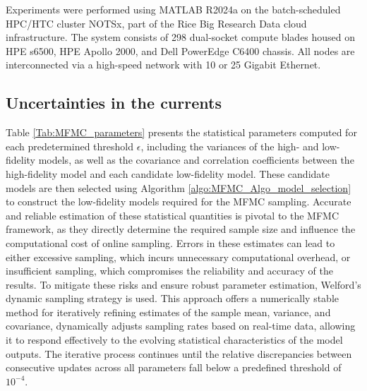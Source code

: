 Experiments were performed using MATLAB R2024a on the batch-scheduled HPC/HTC cluster NOTSx, part of the Rice Big Research Data cloud infrastructure. The system consists of 298 dual-socket compute blades housed on HPE s6500, HPE Apollo 2000, and Dell PowerEdge C6400 chassis. All nodes are interconnected via a high-speed network with 10 or 25 Gigabit Ethernet.


\subsection{Uncertainties in the currents}
Table \ref{Tab:MFMC_parameters} presents the statistical parameters computed for each predetermined threshold $\epsilon$, including the variances of the high- and low-fidelity models, as well as the covariance and correlation coefficients between the high-fidelity model and each candidate low-fidelity model. These candidate models are then selected using Algorithm \ref{algo:MFMC_Algo_model_selection} to construct the low-fidelity models required for the MFMC sampling. Accurate and reliable estimation of these statistical quantities is pivotal to the MFMC framework, as they directly determine the required sample size and influence the computational cost of online sampling. Errors in these estimates can lead to either excessive sampling, which incurs unnecessary computational overhead, or insufficient sampling, which compromises the reliability and accuracy of the results. To mitigate these risks and ensure robust parameter estimation, Welford's dynamic sampling strategy is used. This approach offers a numerically stable method for iteratively refining estimates of the sample mean, variance, and covariance, dynamically adjusts sampling rates based on real-time data, allowing it to respond effectively to the evolving statistical characteristics of the model outputs. The iterative process continues until the relative discrepancies between consecutive updates across all parameters fall below a predefined threshold of $10^{-4}$.


